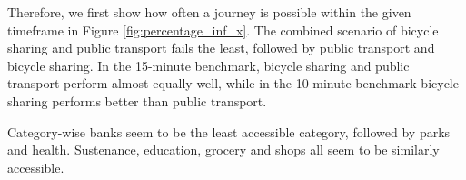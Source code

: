 Therefore, we first show how often a journey is possible within the given timeframe in Figure \ref{fig:percentage_inf_x}.
The combined scenario of bicycle sharing and public transport fails the least, followed by public transport and bicycle sharing.
In the 15-minute benchmark, bicycle sharing and public transport perform almost equally well, while in the 10-minute benchmark bicycle sharing performs better than public transport.

Category-wise banks seem to be the least accessible category, followed by parks and health.
Sustenance, education, grocery and shops all seem to be similarly accessible.

%
%




